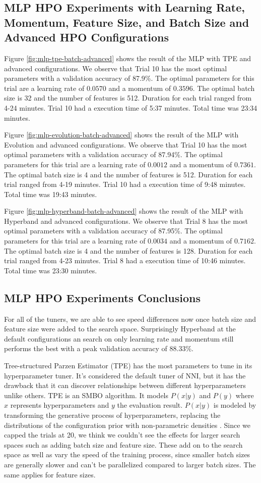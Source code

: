 \documentclass{article}
\begin{document}
\subsection{MLP HPO Experiments with Learning Rate, Momentum, Feature Size, and Batch Size and Advanced HPO Configurations}
Figure \ref{fig:mlp-tpe-batch-advanced} shows the result of the MLP with TPE and advanced configurations. We observe that Trial 10 has the most optimal parameters with a validation accuracy of 87.9\%. The optimal parameters for this trial are a learning rate of $0.0570$ and a momentum of $0.3596$. The optimal batch size is 32 and the number of features is 512. Duration for each trial ranged from 4-24 minutes. Trial 10 had a execution time of 5:37 minutes. Total time was 23:34 minutes.

Figure \ref{fig:mlp-evolution-batch-advanced} shows the result of the MLP with Evolution and advanced configurations. We observe that Trial 10 has the most optimal parameters with a validation accuracy of 87.94\%. The optimal parameters for this trial are a learning rate of $0.0012$ and a momentum of $0.7361$. The optimal batch size is 4 and the number of features is 512. Duration for each trial ranged from 4-19 minutes. Trial 10 had a execution time of 9:48 minutes. Total time was 19:43 minutes.

Figure \ref{fig:mlp-hyperband-batch-advanced} shows the result of the MLP with Hyperband and advanced configurations. We observe that Trial 8 has the most optimal parameters with a validation accuracy of 87.95\%. The optimal parameters for this trial are a learning rate of $0.0034$ and a momentum of $0.7162$. The optimal batch size is 4 and the number of features is 128. Duration for each trial ranged from 4-23 minutes. Trial 8 had a execution time of 10:46 minutes. Total time was 23:30 minutes.

\subsection{MLP HPO Experiments Conclusions}
For all of the tuners, we are able to see speed differences now once batch size and feature size were added to the search space. Surprisingly Hyperband at the default configurations an search on only learning rate and momentum still performs the best with a peak validation accuracy of 88.33\%. 

Tree-structured Parzen Estimator (TPE) has the most parameters to tune in its hyperparameter tuner. It's considered the default tuner of NNI, but it has the drawback that it can discover relationships between different hyperparameters unlike others. TPE is an SMBO algorithm. It models $P(x|y)$ and $P(y)$ where $x$ represents hyperparameters and $y$ the evaluation result. $P(x|y)$ is modeled by transforming the generative process of hyperparameters, replacing the distributions of the configuration prior with non-parametric densities \cite{tpe}. Since we capped the trials at 20, we think we couldn't see the effects for larger search spaces such as adding batch size and feature size. These add on to the search space as well as vary the speed of the training process, since smaller batch sizes are generally slower and can't be parallelized compared to larger batch sizes. The same applies for feature sizes.
\end{document}
